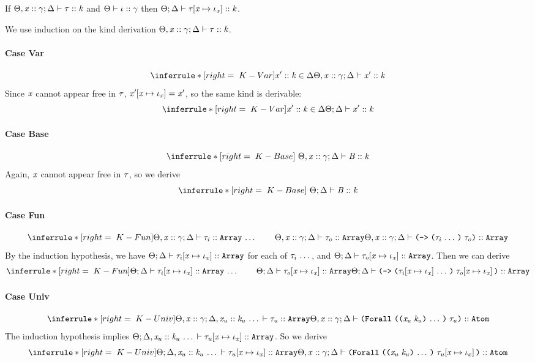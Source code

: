 \begin{lemma}
  \label{ITSub}
  If $\Theta,\mathit{x} :: \mathit{\gamma};\Delta \vdash \mathit{\tau} :: \mathit{k}$
  and $\Theta \vdash \mathit{\iota} :: \mathit{\gamma}$
  then $\Theta;\Delta \vdash \mathit{\tau}\hspace{-2pt}\left[ \mathit{x} \mapsto \mathit{\iota}_{\mathit{x}} \right] :: \mathit{k}$.
\end{lemma}
\begin{sproof}
  We use induction on the kind derivation
  $\Theta,\mathit{x} :: \mathit{\gamma};\Delta \vdash \mathit{\tau} :: \mathit{k}$.
  \paragraph{Case {\sc Var}}
  \[\infr[K-Var]
  {\haskind{\var'}{\kind} \in \kEnv}
  {\kindof{\sEnv,\hassort{\var}{\sort}}{\kEnv}{\var'}{\kind}}\]
  Since $\mathit{x}$ cannot appear free in $\mathit{\tau}$,
  $\mathit{x}'\hspace{-2pt}\left[ \mathit{x} \mapsto \mathit{\iota}_{\mathit{x}} \right] = \mathit{x}'$,
  so the same kind is derivable:
  \[\infr[K-Var]
  {\haskind{\var'}{\kind} \in \kEnv}
  {\kindof{\sEnv}{\kEnv}{\var'}{\kind}}\]
  \paragraph{Case {\sc Base}}
  \[\infr[K-Base]
  {\ }
  {\kindof{\sEnv,\hassort{\var}{\sort}}{\kEnv}{\basetype}{\kind}}\]
  Again, $\mathit{x}$ cannot appear free in $\mathit{\tau}$,
  so we derive
  \[\infr[K-Base]
  {\ }
  {\kindof{\sEnv}{\kEnv}{\basetype}{\kind}}\]
  \paragraph{Case {\sc Fun}}
  \[\infr[K-Fun]
  {\sequence{\kindof{\sEnv,\hassort{\var}{\sort}}{\kEnv}{\type_i}{\kindarray}}
    \qquad \kindof{\sEnv,\hassort{\var}{\sort}}{\kEnv}{\type_o}{\kindarray}}
  {\kindof{\sEnv,\hassort{\var}{\sort}}{\kEnv}
    {\typefun{\sequence{\type_i}}{\type_o}}
    {\kindarray}}\]
  By the induction hypothesis, we have
  $\Theta;\Delta \vdash \mathit{\tau}_i\hspace{-2pt}\left[ \mathit{x} \mapsto \mathit{\iota}_{\mathit{x}} \right] :: \text{\tt Array}$ for each of $\mathit{\tau}_i \, \ldots \,$,
  and $\Theta;\Delta \vdash \mathit{\tau}_o\hspace{-2pt}\left[ \mathit{x} \mapsto \mathit{\iota}_{\mathit{x}} \right] :: \text{\tt Array}$.
  Then we can derive
  \[\infr[K-Fun]
  {\sequence{\kindof{\sEnv}{\kEnv}{\idxsubst{\type_i}}{\kindarray}}
    \qquad \kindof{\sEnv}{\kEnv}{\idxsubst{\type_o}}{\kindarray}}
  {\kindof{\sEnv}{\kEnv}
    {\typefun{\sequence{\idxsubst{\type_i}}}{\idxsubst{\type_o}}}
    {\kindarray}}\]
  \paragraph{Case {\sc Univ}}
  \[\infr[K-Univ]
  {\kindof{\sEnv,\hassort{\var}{\sort}}{\kEnv, \sequence{\haskind{\var_u}{\kind_u}}}{\type_u}{\kindarray}}
  {\kindof{\sEnv,\hassort{\var}{\sort}}{\kEnv}
    {\typeuniv{\sequence{\notevar{\var_u}{\kind_u}}}{\type_u}}
    {\kindatom}}\]
  The induction hypothesis implies
  $\Theta;\Delta, \mathit{x}_u :: \mathit{k}_u \, \ldots \, \vdash \mathit{\tau}_u\hspace{-2pt}\left[ \mathit{x} \mapsto \mathit{\iota}_{\mathit{x}} \right] :: \text{\tt Array}$.
  So we derive
  \[\infr[K-Univ]
  {\kindof{\sEnv}{\kEnv, \sequence{\haskind{\var_u}{\kind_u}}}{\idxsubst{\type_u}}{\kindarray}}
  {\kindof{\sEnv,\hassort{\var}{\sort}}{\kEnv}
    {\typeuniv{\sequence{\notevar{\var_u}{\kind_u}}}{\idxsubst{\type_u}}}
    {\kindatom}}\]

\end{sproof}

